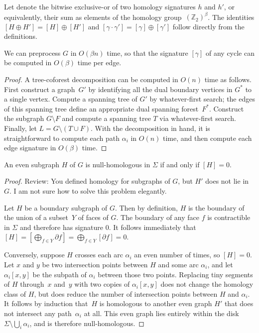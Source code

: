 \documentclass[letterpaper,review]{siamart190516}
\def\Z{\mathbb{Z}}
\def\cycle{\gamma}
\def\dualarc{\alpha}
\def\rnote#1{\color{red}Review: #1 \color{black}}
\begin{document}
Let  denote the bitwise exclusive-or of two homology signatures $h$ and $h'$, or equivalently, their sum as elements of the homology group~$(\Z_2)^\beta$.  The identities $[H \oplus H'] = [H] \oplus [H']$ and $[\cycle\cdot\cycle'] = [\cycle] \oplus [\cycle']$ follow directly from the definitions.

\begin{lemma}
\label{lem:sign}
We can preprocess $G$ in $O(\beta n)$ time, so that the signature $[\cycle]$ of any cycle can be computed in $O(\beta)$ time per edge.
\end{lemma}

\begin{proof}
A tree-coforest decomposition can be computed in $O(n)$ time as follows.  First construct a graph~$G'$ by identifying all the dual boundary vertices in $G^*$ to a single vertex.  Compute a spanning tree of $G'$ by whatever-first search; the edges of this spanning tree define an appropriate dual spanning forest~$F^*$.  Construct the subgraph $G\setminus F$ and compute a spanning tree $T$ via whatever-first search.  Finally, let $L = G\setminus (T\cup F)$.  With the decomposition in hand, it is straightforward to compute each path $\dualarc_i$ in $O(n)$ time, and then compute each edge signature in $O(\beta)$ time.
\end{proof}

\begin{lemma}
An even subgraph $H$ of $G$ is null-homologous in $\Sigma$ if and only if $[H] = 0$.
\end{lemma}

\begin{proof}
\rnote{ 
You defined homology for subgraphs of $G$, but $H'$ does not lie in $G$. I am not sure how to solve this problem elegantly.
}

Let $H$ be a boundary subgraph of $G$.  Then by definition, $H$ is the boundary of the union of a subset~$Y$ of faces of $G$.  The boundary of any face $f$ is contractible in $\Sigma$ and therefore has signature $0$.  It follows immediately that $[H] = [\bigoplus_{f\in Y} \partial f] = \bigoplus_{f\in Y} [\partial f] = 0$.

Conversely, suppose $H$ crosses each arc $\dualarc_i$ an even number of times, so $[H]=0$.  Let $x$ and $y$ be two intersection points between $H$ and some arc $\dualarc_i$, and let $\dualarc_i[x,y]$ be the subpath of $\dualarc_i$ between those two points.  Replacing tiny segments of $H$ through~$x$ and~$y$ with two copies of $\dualarc_i[x,y]$ does not change the homology class of $H$, but does reduce the number of intersection points between $H$ and $\dualarc_i$.  It follows by induction that~$H$ is homologous to another even graph $H'$ that does not intersect any path~$\dualarc_i$ at all.  This even graph lies entirely within the disk $\Sigma\setminus \bigcup_i\dualarc_i$, and is therefore null-homologous.
\end{proof}
\end{document}
